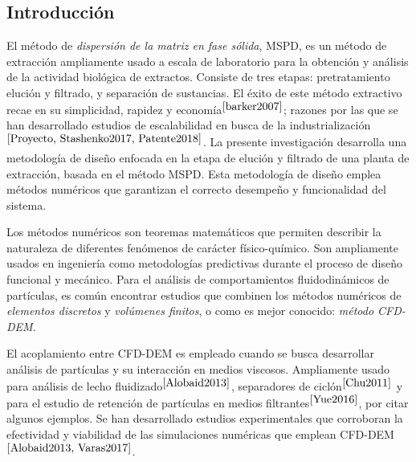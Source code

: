 \begin{center}
	\section{Introducci\'on}
\end{center}

\noindent
\justify

El m\'etodo de \textit{dispersi\'on de la matriz en fase s\'olida}, MSPD, es un m\'etodo de extracci\'on ampliamente usado a escala de laboratorio para la obtenci\'on y an\'alisis de la actividad biol\'ogica de extractos. Consiste de tres etapas: pretratamiento eluci\'on y filtrado, y separaci\'on de sustancias. El \'exito de este m\'etodo extractivo recae en su simplicidad, rapidez y econom\'ia$^{\cite{barker2007}}$; razones por las que se han desarrollado estudios de escalabilidad en busca de la industrializaci\'on$^{\cite{Proyecto, Stashenko2017, Patente2018}}$. La presente investigaci\'on desarrolla una metodolog\'ia de dise\~no enfocada en la etapa de eluci\'on y filtrado de una planta de extracci\'on, basada en el m\'etodo MSPD. Esta metodolog\'ia de dise\~no emplea m\'etodos num\'ericos que garantizan el correcto desempe\~no y funcionalidad del sistema.

\noindent
\justify

Los m\'etodos num\'ericos son teoremas matem\'aticos que permiten describir la naturaleza de diferentes fen\'omenos de car\'acter f\'isico-qu\'imico. Son ampliamente usados en ingenier\'ia como metodolog\'ias predictivas durante el proceso de dise\~no funcional y mec\'anico. Para el an\'alisis de comportamientos fluidodin\'amicos de part\'iculas, es com\'un encontrar estudios que combinen los m\'etodos num\'ericos de \textit{elementos discretos} y \textit{vol\'umenes finitos}, o como es mejor conocido: \textit{m\'etodo CFD-DEM}.

\noindent
\justify

El acoplamiento entre CFD-DEM es empleado cuando se busca desarrollar an\'alisis de part\'iculas y su interacci\'on en medios viscosos. Ampliamente usado para an\'alisis de lecho fluidizado$^{\cite{Alobaid2013}}$, separadores de cicl\'on$^{\cite{Chu2011}}$ y para el estudio de retenci\'on de part\'iculas en medios filtrantes$^{\cite{Yue2016}}$, por citar algunos ejemplos. Se han desarrollado estudios experimentales que corroboran la efectividad y viabilidad de las simulaciones num\'ericas que emplean CFD-DEM$^{\cite{Alobaid2013, Varas2017}}$.

\noindent
\justify

